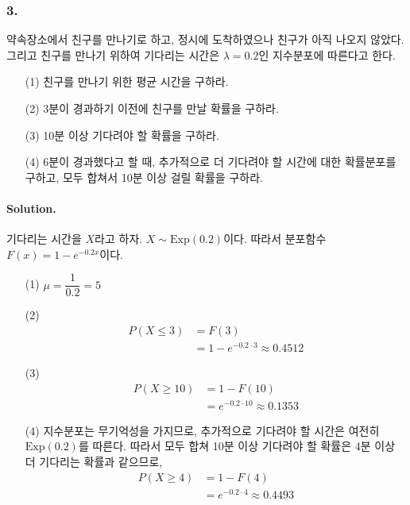 \subsubsection{3.} 약속장소에서 친구를 만나기로 하고, 정시에 도착하였으나 친구가 아직 나오지 않았다. 그리고 친구를 만나기 위하여 기다리는 시간은 $\lambda=0.2$인 지수분포에 따른다고 한다.

\begin{itemize}
	\item [(1)] 친구를 만나기 위한 평균 시간을 구하라.
	\item [(2)] 3분이 경과하기 이전에 친구를 만날 확률을 구하라.
	\item [(3)] 10분 이상 기다려야 할 확률을 구하라.
	\item [(4)] 6분이 경과했다고 할 때, 추가적으로 더 기다려야 할 시간에 대한 확률분포를 구하고, 모두 합쳐서 10분 이상 걸릴 확률을 구하라.
\end{itemize}

\paragraph{Solution.} 기다리는 시간을 $X$라고 하자. $X\sim \mathrm{Exp}\left(0.2\right)$이다. 따라서 분포함수 $F\left(x\right)=1-e^{-0.2x}$이다.
\begin{itemize}
	\item [(1)] {
		$\mu = \dfrac{1}{0.2} = 5$
	}
	\item [(2)] {
		\begin{align*}
			P\left(X \leq 3\right) &= F\left(3\right) \\
			&= 1 - e^{-0.2\cdot 3} \approx 0.4512
		\end{align*}
	}
	\item [(3)] {
		\begin{align*}
			P\left(X \geq 10\right) &= 1 - F\left(10\right) \\
			&= e^{-0.2\cdot 10} \approx 0.1353
		\end{align*}
	}
	\item [(4)] {
		지수분포는 무기억성을 가지므로, 추가적으로 기다려야 할 시간은 여전히 $\mathrm{Exp}\left(0.2\right)$를 따른다.
		따라서 모두 합쳐 10분 이상 기다려야 할 확률은 4분 이상 더 기다리는 확률과 같으므로,
		\begin{align*}
			P\left(X \geq 4\right) &= 1 - F\left(4\right) \\
			&= e^{-0.2\cdot 4} \approx 0.4493
		\end{align*}
	}
\end{itemize}

